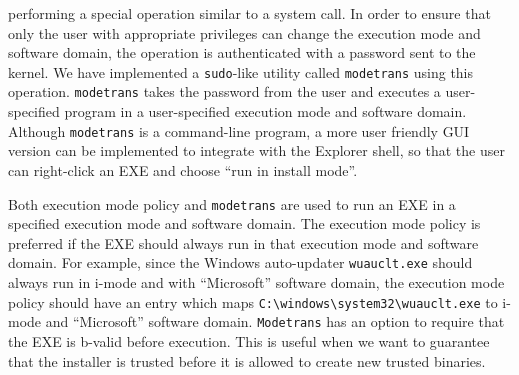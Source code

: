 \begin{description}
performing a special operation similar to a system call.
In order to ensure that only the user with appropriate privileges
can change the execution mode and software domain, the operation is authenticated with
a password sent to the kernel.
We have implemented a {\tt sudo}-like utility called {\tt modetrans}
using this operation.
{\tt modetrans} takes the password from the user and
executes a user-specified program in a user-specified execution mode and software domain.
Although {\tt modetrans} is a command-line program,
a more user friendly GUI version can be implemented to
integrate with the Explorer shell, so that the user can right-click
an EXE and choose ``run in install mode''.

Both execution mode policy and {\tt modetrans} are used to run an EXE in a
specified execution mode and software domain.
The execution mode policy is preferred if the EXE should always run
in that execution mode and software domain.
For example, since the Windows auto-updater {\tt wuauclt.exe} should
always run in i-mode and with ``Microsoft'' software domain, the execution mode policy
should have an entry which maps \verb|C:\windows\system32\wuauclt.exe|
to i-mode and ``Microsoft'' software domain.
{\tt Modetrans} has an option to require that the EXE is b-valid
before execution.
This is useful when we want to guarantee that the installer
is trusted before it is allowed to create new trusted binaries.
\end{description}

